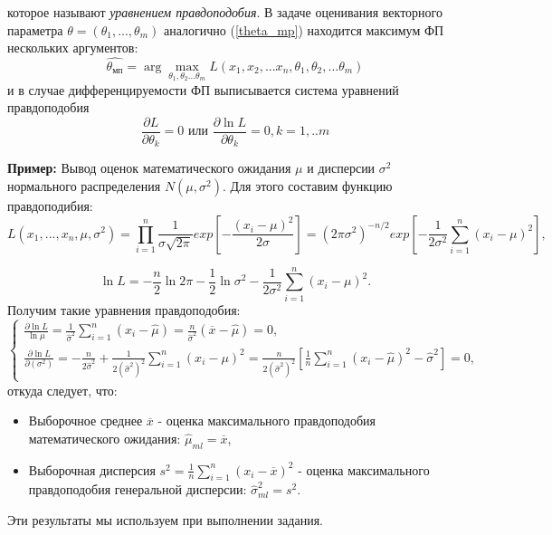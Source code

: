 \documentclass[../body.tex]{subfiles}
\begin{document}
	которое называют \textit{уравнением правдоподобия}.
	В задаче оценивания векторного параметра $\theta = (\theta_{1}, ... ,\theta_{m})$ аналогично (\ref{theta_mp}) находится максимум ФП нескольких аргументов: 
	\begin{equation}
		\hat{\theta_{мп}} = \arg \max_{\theta_{1}, \theta_{2}...\theta_{m}} L(x_{1}, x_{2},...x_{n}, \theta_{1}, \theta_{2},...\theta_{m})
		\label{multi_theta}
	\end{equation}
	и в случае дифференцируемости ФП выписывается система уравнений правдоподобия
	\begin{equation}
		\frac{\partial L}{\partial \theta_{k}} = 0 \text{  или  } \frac{\partial \ln L}{\partial \theta_{k}} = 0, k = 1,..m
	\end{equation}
	
	\textbf{Пример:} \label{normal} Вывод оценок математического ожидания $\mu$ и дисперсии $\sigma^2$ нормального распределения $N(\mu, \sigma^2)$.
	Для этого составим функцию правдоподибия:
	$$L(x_1, ..., x_n, \mu, \sigma^2) = \prod\limits_{i=1}^{n} \frac{1}{\sigma\sqrt{2\pi}}exp\left[-\frac{(x_i - \mu)^2}{2\sigma}\right] = (2\pi\sigma^2)^{-n/2}exp\left[-\frac{1}{2\sigma^2}\sum_{i = 1}^{n}(x_i - \mu)^2\right],$$
	
	$$\ln L = -\frac{n}{2}\ln 2\pi - \frac{1}{2}\ln \sigma^2 - \frac{1}{2\sigma^2}\sum_{i = 1}^{n}(x_i - \mu)^2.$$
	Получим такие уравнения правдоподобия:
	$$
	\begin{cases}
		\frac{\partial\ln L}{\ln \mu} = \frac{1}{\hat{\sigma}^2} \sum_{i = 1}^{n}(x_i - \hat{\mu}) = \frac{n}{\hat{\sigma}^2}(\overline{x} - \hat{\mu}) = 0,\\
		\frac{\partial \ln L}{\partial (\sigma^2)} = -\frac{n}{2\hat{\sigma}^2} + \frac{1}{2(\hat{\sigma}^2)^2}\sum_{i = 1}^{n}(x_i - \mu)^2 = \frac{n}{2(\hat{\sigma}^2)^2}\left[\frac{1}{n}\sum_{i = 1}^{n}(x_i - \hat{\mu})^2 - \hat{\sigma}^2\right] = 0,
	\end{cases}
	$$
	откуда следует, что:
	\begin{itemize}
		\item Выборочное среднее $\overline{x}$ - оценка максимального правдоподобия математического ожидания: $\hat{\mu}_{ml} = \overline{x}$,
		\item Выборочная дисперсия $s^2 = \frac{1}{n}\sum_{i = 1}^{n}(x_i - \overline{x})^2$ - оценка максимального правдоподобия генеральной дисперсии: $\hat{\sigma}_{ml}^2 = s^2$\cite[c.~442 - 444]{max}.
	\end{itemize}
	Эти результаты мы используем при выполнении задания.
	
\end{document}
